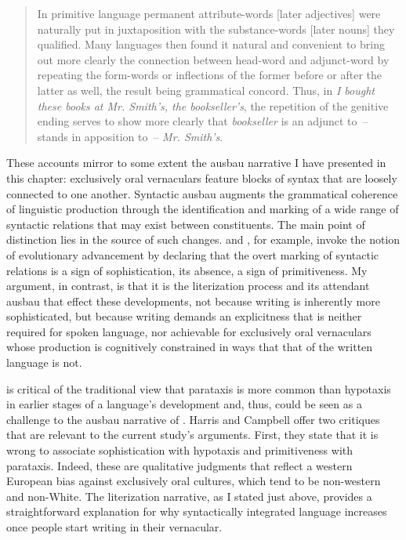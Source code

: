 \begin{quote}
In primitive language permanent attribute-words [later adjectives] were naturally put in juxtaposition with the substance-words [later nouns] they qualified. Many languages then found it natural and convenient to bring out more clearly the connection between head-word and adjunct-word by repeating the form-words or inflections of the former before or after the latter as well, the result being grammatical concord. Thus, in \textit{I bought these books at Mr. Smith’s, the bookseller’s}, the repetition of the genitive ending serves to show more clearly that \textit{bookseller} is an adjunct to~-- stands in apposition to~-- \textit{Mr. Smith’s}.
\end{quote}

\noindent These accounts mirror to some extent the ausbau narrative I have presented in this chapter: exclusively oral vernaculars feature blocks of syntax that are loosely connected to one another. Syntactic ausbau augments the grammatical coherence of linguistic production through the identification and marking of a wide range of syntactic relations that may exist between constituents. The main point of distinction lies in the source of such changes. \citet{Sweet1900} and \citet[205]{Windisch1869}, for example, invoke the notion of evolutionary advancement by declaring that the overt marking of syntactic relations is a sign of sophistication, its absence, a sign of primitiveness. My argument, in contrast, is that it is the literization process and its attendant ausbau that effect these developments, not because writing is inherently more sophisticated, but because writing demands an explicitness that is neither required for spoken language, nor achievable for exclusively oral vernaculars whose production is cognitively constrained in ways that that of the written language is not.

\citet[282--284; 308--310]{HarrisCampbell1995} is critical of the traditional view that parataxis is more common than hypotaxis in earlier stages of a language’s development and, thus, could be seen as a challenge to the ausbau narrative of \citet{KochOesterreicher1994}. Harris and Campbell offer two critiques that are relevant to the current study’s arguments. First, they state that it is wrong to associate sophistication with hypotaxis and primitiveness with parataxis. Indeed, these are qualitative judgments that reflect a western European bias against exclusively oral cultures, which tend to be non-western and non-White. The literization narrative, as I stated just above, provides a straightforward explanation for why syntactically integrated language increases once people start writing in their vernacular.


